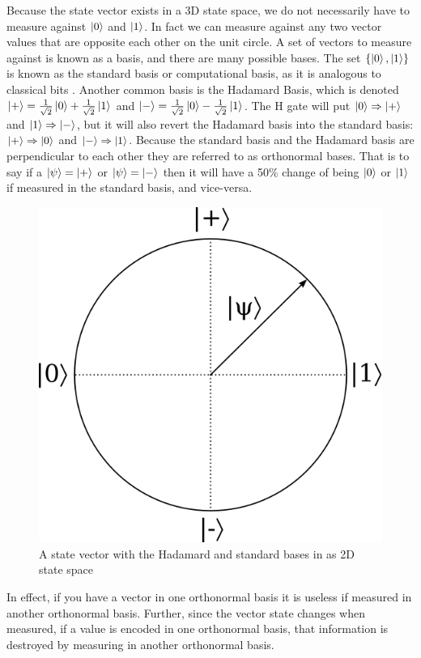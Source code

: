 Because the state vector exists in a 3D state space, we do not necessarily have to measure against $\ket{0}$ and $\ket{1}$.
In fact we can measure against any two vector values that are opposite each other on the unit circle. 
A set of vectors to measure against is known as a basis, and there are many possible bases. 
The set $\{\ket{0},\ket{1}\}$ is known as the standard basis or computational basis, as it is analogous to classical bits \cite{qcftgu}.
Another common basis is the Hadamard Basis, which is denoted $\ket{+} = \frac{1}{\sqrt{2}}\ket{0} + \frac{1}{\sqrt{2}}\ket{1}$ and $\ket{-} = \frac{1}{\sqrt{2}}\ket{0} - \frac{1}{\sqrt{2}}\ket{1}$.
The H gate will put $\ket{0} \Rightarrow \ket{+}$ and $\ket{1} \Rightarrow \ket{-}$, but it will also revert the Hadamard basis into the standard basis: $\ket{+} \Rightarrow \ket{0}$ and $\ket{-} \Rightarrow \ket{1}$.
Because the standard basis and the Hadamard basis are perpendicular to each other they are referred to as orthonormal bases.
That is to say if a $\ket{\psi} = \ket{+}$ or $\ket{\psi} = \ket{-}$ then it will have a 50\% change of being $\ket{0}$ or $\ket{1}$ if measured in the standard basis, and vice-versa. 
\begin{figure}[htp]
\centering
\includegraphics[scale=0.25]{images/orthonormal_basis.png}
\caption{A state vector with the Hadamard and standard bases in as 2D state space}
\label{}
\end{figure}
In effect, if you have a vector in one orthonormal basis it is useless if measured in another orthonormal basis.
Further, since the vector state changes when measured, if a value is encoded in one orthonormal basis, that information is destroyed by measuring in another orthonormal basis. 

